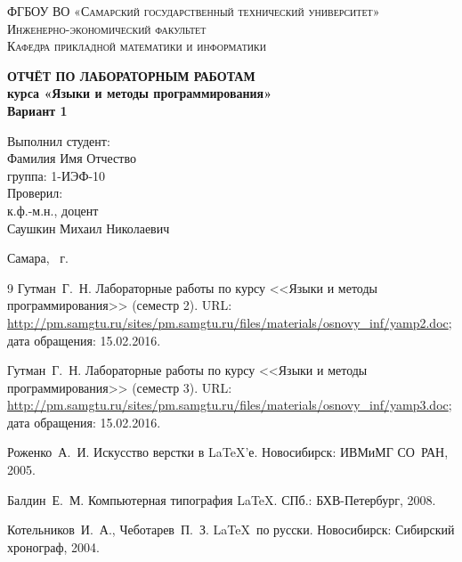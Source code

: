 \documentclass[14pt,a4paper,report]{ncc}
\begin{document}
\renewcommand{\chaptername}{Лабораторная работа}
\def\contentsname{Содержание}

\begin{titlepage}
\begin{center}
\textsc{ФГБОУ ВО «Самарский государственный технический университет»\\[5mm]
Инженерно-экономический факультет\\[2mm]
Кафедра прикладной математики и информатики}

\vfill

\textbf{ОТЧЁТ ПО ЛАБОРАТОРНЫМ РАБОТАМ\\[3mm]
курса «Языки и методы программирования»\\[6mm]
Вариант 1
\\[20mm]
}
\end{center}

\hfill
\begin{minipage}{.5\textwidth}
Выполнил студент:\\[2mm] 
Фамилия Имя Отчество\\
группа: 1-ИЭФ-10\\[5mm]

Проверил:\\[2mm] 
к.ф.-м.н., доцент\\
Саушкин Михаил Николаевич
\end{minipage}%
\vfill
\begin{center}
 Самара, \theyear\ г.
\end{center}
\end{titlepage}

\tableofcontents
\newpage



\begin{thebibliography}{9}
Гутман~Г.~Н. Лабораторные работы по курсу <<Языки и методы программирования>> (семестр 2). URL: \url{http://pm.samgtu.ru/sites/pm.samgtu.ru/files/materials/osnovy_inf/yamp2.doc}; дата обращения: 15.02.2016.

Гутман~Г.~Н. Лабораторные работы по курсу <<Языки и методы программирования>> (семестр 3). URL: \url{http://pm.samgtu.ru/sites/pm.samgtu.ru/files/materials/osnovy_inf/yamp3.doc}; дата обращения: 15.02.2016.

Роженко~А.~И. Искусство верстки в \LaTeX'е.  Новосибирск: ИВМиМГ СО~РАН, 2005.

Балдин~Е.~М. Компьютерная типография \LaTeX.  СПб.: БХВ-Петербург, 2008.

Котельников~И.~А., Чеботарев~П.~З. \LaTeX\ по русски.
Новосибирск: Сибирский хронограф, 2004. 

\end{thebibliography}
\end{document}
